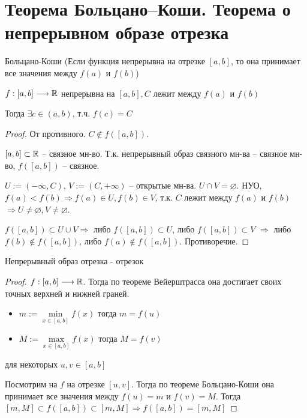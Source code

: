 
\section{Теорема Больцано–Коши. Теорема о непрерывном образе отрезка \href{https://youtu.be/E7inz4tp-6k?t=8060}{\Walley}}
\begin{theorem-non}
    Больцано-Коши (Если функция непрерывна на отрезке $[a, b]$, то она принимает все значения между $f(a)$ и $f(b)$)

    $f: [a, b] \longrightarrow \mathbb{R}$ непрерывна на $[a, b], C$ лежит между $f(a)$ и $f(b)$

    Тогда $\exists c\in (a, b)$, т.ч. $f(c) = C$
    \begin{proof} От противного. $C \notin f([a, b])$.

        $[a, b] \subset \mathbb{R}$ -- связное мн-во. Т.к. непрерывный образ связного 
        мн-ва -- связное мн-во, $f([a, b])$ -- связное. 
    
        $U := (-\infty, C)$, $V := (C, +\infty)$ -- открытые мн-ва.
        $U \cap V = \varnothing$. НУО, $f(a) < f(b) \Rightarrow
        f(a) \in U, f(b) \in V$, т.к. $C$ лежит между $f(a)$ и $f(b)$
        $\Rightarrow U \neq \varnothing, V \neq \varnothing$.
    
        $f([a, b]) \subset U \cup V \Rightarrow$ либо $f([a, b]) \subset U$,
        либо $f([a, b]) \subset V$ $\Rightarrow$ либо $f(b) \notin f([a, b])$,
        либо $f(a) \notin f([a, b])$. Противоречие.
    
    \end{proof}
\end{theorem-non}

\begin{theorem-non}
    Непрерывный образ отрезка - отрезок 

    \begin{proof} \quad

        $f:[a, b] \longrightarrow \mathbb{R}$.
        Тогда по теореме Вейерштрасса она достигает своих точных верхней и нижней граней.
        \begin{itemize}
            \item[] $m:= \min\limits_{x \in [a, b]}{f(x)}$ \qquad тогда $m = f(u)$
            \item[] $M:= \max\limits_{x \in [a, b]}{f(x)}$ \qquad тогда $M = f(v)$
        \end{itemize} для некоторых $u, v \in [a, b]$

        Посмотрим на $f$ на отрезке $[u, v]$. Тогда по теореме Больцано-Коши она принимает все значения между $f(u) = m$
        и $f(v) = M$. Тогда $[m, M] \subset f([a, b]) \subset [m, M] \Longrightarrow f([a, b]) = [m, M]$ 
    \end{proof}
\end{theorem-non}